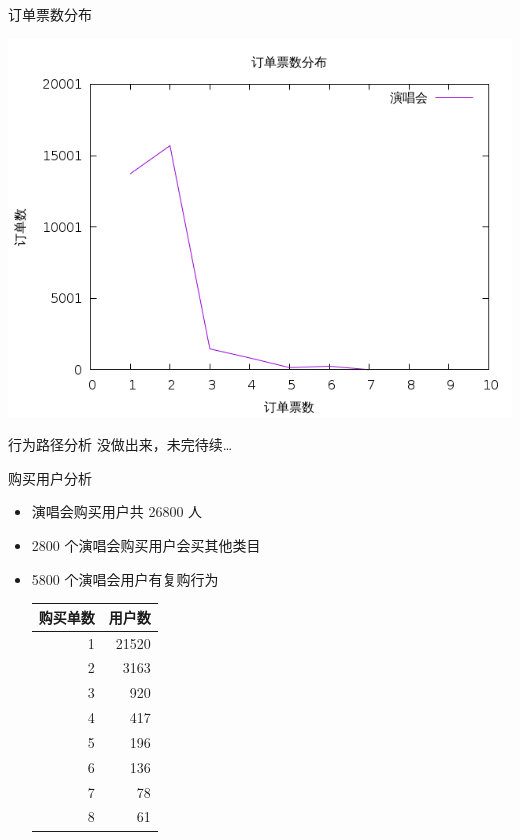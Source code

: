 \documentclass[presentation, bigger]{beamer}
\begin{document}
\begin{frame}[label={sec:org1c1c11e}]{订单票数分布}
\begin{center}
\includegraphics[width=.9\linewidth]{./image/order-tickets-distribution.png}
\end{center}
\end{frame}

\begin{frame}[label={sec:org3a43e9f}]{行为路径分析}
\alert{没做出来，未完待续\ldots{}}
\end{frame}
\begin{frame}[label={sec:orgead1a8a}]{购买用户分析}
\begin{itemize}
\item 演唱会购买用户共 26800 人
\item 2800 个演唱会购买用户会买其他类目
\item 5800 个演唱会用户有复购行为
\begin{center}
\begin{tabular}{rr}
购买单数 & 用户数\\
\hline
1 & 21520\\
2 & 3163\\
3 & 920\\
4 & 417\\
5 & 196\\
6 & 136\\
7 & 78\\
8 & 61\\
\end{tabular}
\end{center}
\end{itemize}
\end{frame}
\end{document}
